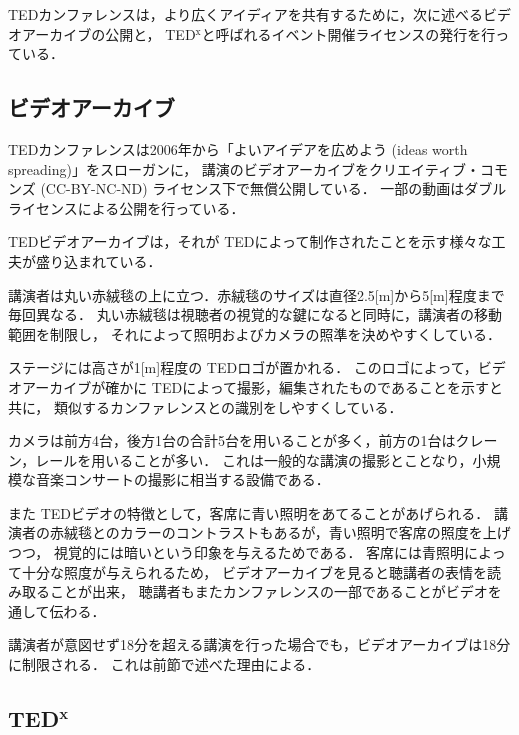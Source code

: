 \documentclass[submit,techreq,jkeyword,noauthor]{ipsj}
\newcommand{\TED}{\textrm{TED}}
\newcommand{\TEDx}{\TED${}^{\textrm{x}}$}
\newcommand{\TEDtitle}{\textbf{TED}}
\newcommand{\TEDxtitle}{\TEDtitle${}^{\textbf{x}}$}
\begin{document}

\TED カンファレンスは，より広くアイディアを共有するために，次に述べるビデオアーカイブの公開と，
\TEDx と呼ばれるイベント開催ライセンスの発行を行っている．

\subsection{ビデオアーカイブ}

\TED カンファレンスは2006年から「よいアイデアを広めよう (ideas worth spreading)」をスローガンに，
講演のビデオアーカイブをクリエイティブ・コモンズ (CC-BY-NC-ND) ライセンス下で無償公開している．
一部の動画はダブルライセンスによる公開を行っている．

\TED ビデオアーカイブは，それが \TED によって制作されたことを示す様々な工夫が盛り込まれている．

講演者は丸い赤絨毯の上に立つ．赤絨毯のサイズは直径2.5[m]から5[m]程度まで毎回異なる．
丸い赤絨毯は視聴者の視覚的な鍵になると同時に，講演者の移動範囲を制限し，
それによって照明およびカメラの照準を決めやすくしている．

ステージには高さが1[m]程度の \TED ロゴが置かれる．
このロゴによって，ビデオアーカイブが確かに \TED によって撮影，編集されたものであることを示すと共に，
類似するカンファレンスとの識別をしやすくしている．

カメラは前方4台，後方1台の合計5台を用いることが多く，前方の1台はクレーン，レールを用いることが多い．
これは一般的な講演の撮影とことなり，小規模な音楽コンサートの撮影に相当する設備である．

また \TED ビデオの特徴として，客席に青い照明をあてることがあげられる．
講演者の赤絨毯とのカラーのコントラストもあるが，青い照明で客席の照度を上げつつ，
視覚的には暗いという印象を与えるためである．
客席には青照明によって十分な照度が与えられるため，
ビデオアーカイブを見ると聴講者の表情を読み取ることが出来，
聴講者もまたカンファレンスの一部であることがビデオを通して伝わる．

講演者が意図せず18分を超える講演を行った場合でも，ビデオアーカイブは18分に制限される．
これは前節で述べた理由による．


\subsection{\TEDxtitle}
\end{document}

